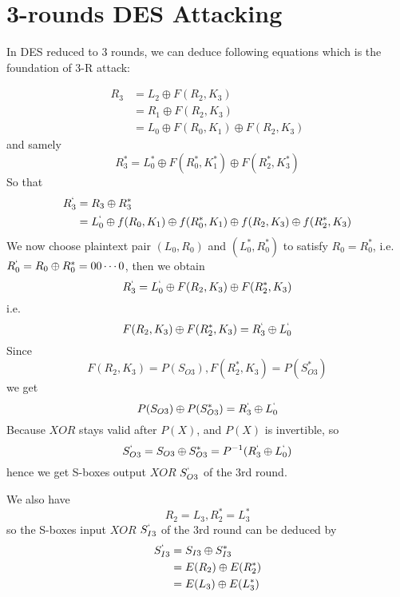 \documentclass[a4paper,10pt]{article}
\begin{document}
\section{3-rounds DES Attacking}

In DES reduced to 3 rounds, we can deduce following equations which is the foundation of 3-R attack:

\begin{equation}
  \begin{split}
  R_3 &= L_2 \oplus F(R_2,K_3)\\
      &= R_1 \oplus F(R_2,K_3) \\
      &= L_0 \oplus F(R_0,K_1) \oplus F(R_2,K_3)
  \end{split}
\end{equation}
and samely
\begin{equation}
  R_3^*=L_0^* \oplus F(R_0^*, K_1^*) \oplus F(R_2^*,K_3^*)
\end{equation}
So that
\begin{equation}
  \begin{split}
  R_3^`&= R_3 \oplus R_3^*\\
       &= L_0^` \oplus f(R_0,K_1) \oplus f(R_0^*,K_1) \oplus f(R_2,K_3) \oplus f(R_2^*,K_3) 
  \end{split}
\end{equation}
We now choose plaintext pair $(L_0,R_0)$ and $(L_0^*,R_0^*)$ to satisfy $R_0 = R_0^*$, i.e. $R_0^` = R_0 \oplus R_0^* = 00\cdots0$, then we obtain
\begin{equation*}
  R_3^` = L_0^` \oplus F(R_2,K_3) \oplus F(R_2^*,K_3)\\
\end{equation*}
i.e.
\begin{equation}
  F(R_2,K_3) \oplus F(R_2^*,K_3) = R_3^` \oplus L_0^`
\end{equation}
Since
\begin{equation*}
  F(R_2,K_3) = P(S_{O3}), F(R_2^*,K_3)=P(S_{O3}^*)
\end{equation*}
we get
\begin{equation*}
  P(S_{O3}) \oplus P(S_{O3}^*) = R_3^` \oplus L_0^`
\end{equation*}
Because $XOR$ stays valid after $P(X)$, and $P(X)$ is invertible, so
\begin{equation}
  S_{O3}^` = S_{O3} \oplus S_{O3}^* = P^{-1}(R_3^` \oplus L_0^`)
\end{equation}
hence we get S-boxes output $XOR$ $S_{O3}^`$ of the 3rd round.

We also have
\begin{equation*}
  R_2 = L_3, R_2^* = L_3^*
\end{equation*}
so the S-boxes input $XOR$ $S_{I3}^`$ of the 3rd round can be deduced by
\begin{equation} 
  \begin{split}
  S_{I3}^` &= S_{I3} \oplus S_{I3}^* \\
           &= E(R_2) \oplus E(R_2^*) \\
           &= E(L_3) \oplus E(L_3^*)
  \end{split}
\end{equation} 
\end{document}

